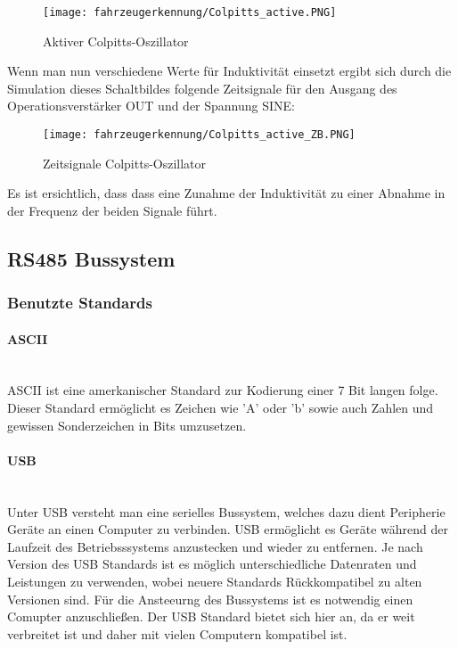 \begin{figure}[H]
    \centering
    \texttt{[image: fahrzeugerkennung/Colpitts\_active.PNG]}
    \caption{Aktiver Colpitts-Oszillator}
\end{figure}

Wenn man nun verschiedene Werte für Induktivität einsetzt ergibt sich durch die Simulation dieses Schaltbildes folgende Zeitsignale für den Ausgang des Operationsverstärker OUT und der Spannung SINE:

\begin{figure}[H]
    \centering
    \texttt{[image: fahrzeugerkennung/Colpitts\_active\_ZB.PNG]}
    \caption{Zeitsignale Colpitts-Oszillator}
\end{figure}

Es ist ersichtlich, dass dass eine Zunahme der Induktivität zu einer Abnahme in der Frequenz der beiden Signale führt.
\pagebreak
\subsection{RS485 Bussystem}
\subsubsection{Benutzte Standards}
\paragraph{ASCII}\mbox{}\\
ASCII ist eine amerkanischer Standard zur Kodierung einer 7 Bit langen folge. Dieser Standard ermöglicht es Zeichen wie 'A' oder 'b' sowie auch Zahlen und gewissen Sonderzeichen in Bits umzusetzen. 
\paragraph{USB}\mbox{}\\

Unter USB versteht man eine serielles Bussystem, welches dazu dient Peripherie Geräte an einen Computer zu verbinden. USB ermöglicht es Geräte während der Laufzeit des Betriebsssystems anzustecken und wieder zu entfernen.
Je nach Version des USB Standards ist es möglich unterschiedliche Datenraten und Leistungen zu verwenden, wobei neuere Standards Rückkompatibel zu alten Versionen sind. Für die Ansteeurng des Bussystems ist es notwendig einen Comupter anzuschließen. 
Der USB Standard bietet sich hier an, da er weit verbreitet ist und daher mit vielen Computern kompatibel ist.


